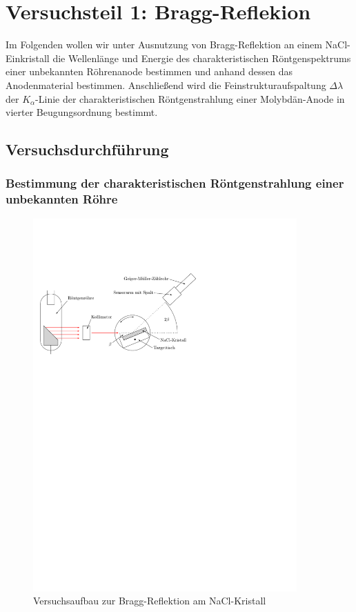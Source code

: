 \documentclass[10pt, a4paper]{article}
\begin{document}
\section{Versuchsteil 1: Bragg-Reflekion}
Im Folgenden wollen wir unter Ausnutzung von Bragg-Reflektion an einem NaCl-Einkristall die Wellenlänge und Energie des charakteristischen Röntgenspektrums einer unbekannten Röhrenanode bestimmen und anhand dessen das Anodenmaterial bestimmen.
Anschließend wird die Feinstrukturaufspaltung $\Delta \lambda$ der $K_\alpha$-Linie der charakteristischen Röntgenstrahlung einer Molybdän-Anode in vierter Beugungsordnung bestimmt.

\subsection{Versuchsdurchführung}
\subsubsection{Bestimmung der charakteristischen Röntgenstrahlung einer unbekannten Röhre}
\begin{figure}[h]
\centering
\includegraphics[width=0.9\textwidth]{./grafiken/aufbau_bragg.pdf}
\caption{Versuchsaufbau zur Bragg-Reflektion am NaCl-Kristall}
\label{fig:bragg_aufbau}
\end{figure}
\end{document}
